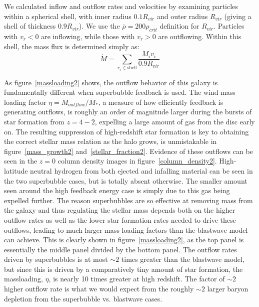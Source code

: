 We calculated inflow and outflow rates and velocities by examining particles
within a spherical shell, with inner radius $0.1R_{vir}$ and outer radius
$R_{vir}$ (giving a shell of thickness $0.9R_{vir}$).  We use the $\bar\rho =
200\rho_{crit}$ definition for $R_{vir}$.  Particles with $v_r < 0$ are
inflowing, while those with $v_r > 0$ are outflowing.
Within this shell, the mass flux is determined simply as:
\begin{equation}
    \dot M = \sum_{r_i\in\mathrm{shell}}\frac{M_i v_i}{0.9R_{vir}}
    \label{halo_massflux2}
\end{equation}

As figure~\ref{massloading2} shows, the outflow behavior of this galaxy is
fundamentally different when superbubble feedback is used.  The wind mass
loading factor $\eta = \dot M_{outflow} / \dot M_*$, a measure of how
efficiently feedback is generating outflows, is roughly an order of magnitude
larger during the bursts of star formation from $z=4-2$, expelling a large
amount of gas from the disc early on.  The resulting suppression of
high-redshift star formation is key to obtaining the correct stellar mass
relation as the halo grows, is unmistakable in figure~\ref{mass_growth2}
and~\ref{stellar_fraction2}.  Evidence of these outflows can be seen in the $z=0$
column density images in figure~\ref{column_density2}.  High-latitude neutral
hydrogen from both ejected and infalling material can be seen in the two
superbubble cases, but is totally absent otherwise.  The smaller amount seen
around the high feedback energy case is simply due to this gas being expelled
further.  The reason superbubbles are so effective at removing mass from the
galaxy and thus regulating the stellar mass depends both on the higher outflow
rates as well as the lower star formation rates needed to drive these outflows,
leading to much larger mass loading factors than the blastwave model can
achieve.  This is clearly shown in figure~\ref{massloading2}, as the top panel is
essentially the middle panel divided by the bottom panel.  The outflow rates
driven by superbubbles is at most $\sim2$ times greater than the blastwave model,
but since this is driven by a comparatively tiny amount of star formation, the
massloading, $\eta$, is nearly 10 times greater at high redshift.  The factor of
$\sim2$ higher outflow rate is what we would expect from the roughly $\sim2$
larger baryon depletion from the superbubble vs. blastwave cases.

